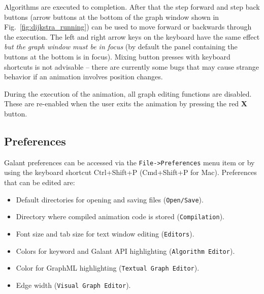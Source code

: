 Algorithms are executed to completion. After that the step forward and step
back buttons (arrow buttons at the bottom of the graph window shown in Fig.~\ref{fig:dijkstra_running}) can be used to move forward or backwards through the execution.
The left and right arrow keys on the keyboard have the same effect
\emph{but the graph window must be in focus} (by default the panel
containing the buttons at the
bottom is in focus).
Mixing button presses with keyboard shortcuts is not advisable --
there are currently some bugs that may cause strange behavior if an animation
involves position changes.

During the execution of the animation, all graph editing functions are disabled.
These are re-enabled when the user exits the animation by pressing the red \textbf{X} button.

\subsection{Preferences}
\label{sec:preferences}

Galant preferences can be accessed via the \texttt{File->Preferences}
menu item or by using the keyboard shortcut Ctrl+Shift+P (Cmd+Shift+P for Mac).
Preferences that can be edited are:
\begin{itemize}
\item
Default directories for opening and saving files (\texttt{Open/Save}).
\item
Directory where compiled animation code is stored (\texttt{Compilation}).
\item
Font size and tab size for text window editing (\texttt{Editors}).
\item
Colors for keyword and Galant API highlighting (\texttt{Algorithm~Editor}).
\item
Color for GraphML highlighting (\texttt{Textual~Graph~Editor}).
\item
Edge width (\texttt{Visual~Graph~Editor}).
\end{itemize}


